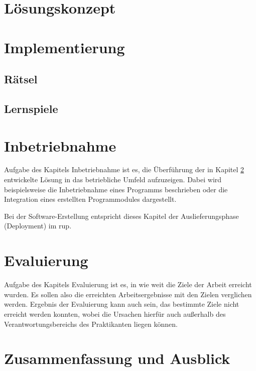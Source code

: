 
\chapter{Lösungskonzept}
\label{cha:loesungskonzept}


\chapter{Implementierung}
\label{cha:implementierung}

\section{Rätsel}
\label{sec:raetsel}


\section{Lernspiele}
\label{sec:lernspiele}

\chapter{Inbetriebnahme}
\label{cha:inbetriebnahme}

Aufgabe des Kapitels Inbetriebnahme ist es, die Überführung der in 
Kapitel \ref{cha:implementierung} entwickelte Lösung in das betriebliche 
Umfeld aufzuzeigen. Dabei wird beispielsweise die Inbetriebnahme eines 
Programms beschrieben oder die Integration eines erstellten 
Programmodules dargestellt.

Bei der Software-Erstellung entspricht dieses Kapitel der 
Auslieferungsphase (Deployment) im \ac{rup}.

\chapter{Evaluierung}

Aufgabe des Kapitels Evaluierung ist es, in wie weit die Ziele der 
Arbeit erreicht wurden. Es sollen also die erreichten Arbeitsergebnisse 
mit den Zielen verglichen werden. Ergebnis der Evaluierung kann auch 
sein, das bestimmte Ziele nicht erreicht werden konnten, wobei die 
Ursachen hierfür auch außerhalb des Verantwortungsbereichs des 
Praktikanten liegen können.

\chapter{Zusammenfassung und Ausblick}
\label{cha:zusammenfassung}

